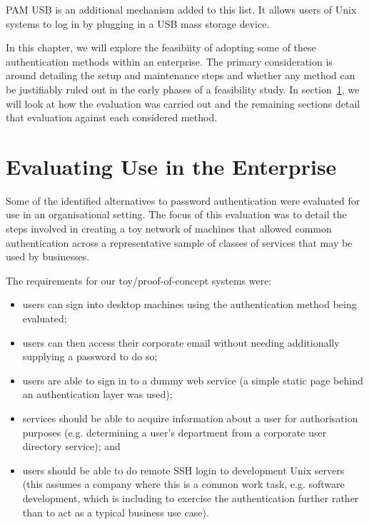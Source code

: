 \documentclass{report}
\begin{document}
PAM USB is an additional mechanism added to
this list. It allows users of Unix systems to log in by plugging in a USB
mass storage device.

In this chapter, we will explore the feasibiity of adopting some of
these authentication methods within an enterprise. The primary consideration
is around detailing the setup and maintenance steps and whether any
method can be justifiably ruled out in the early phases of a feasibility
study. In section~\ref{sec:evaluation}, we will look at how the evaluation
was carried out and the remaining sections detail that evaluation against each
considered method.

\section{Evaluating Use in the Enterprise}
\label{sec:evaluation}

Some of the identified alternatives to password authentication were
evaluated for use in an organisational setting. The focus of this evaluation
was to detail the steps involved in creating a toy network of machines
that allowed common authentication across a representative sample of
classes of services that may be used by businesses.

The requirements for our toy/proof-of-concept systems were:

\begin{itemize}
  \item users can sign into desktop machines using the authentication method
    being evaluated;
  \item users can then access their corporate email without needing additionally
    supplying a password to do so;
  \item users are able to sign in to a dummy web service (a simple static page
    behind an authentication layer was used);
  \item services should be able to acquire information about a user for
    authorisation purposes (e.g. determining a user's department from
    a corporate user directory service); and
  \item users should be able to do remote SSH login to development Unix
    servers (this assumes a company where this is a common work task, e.g.
    software development, which is including to exercise the authentication
    further rather than to act as a typical business use case).
\end{itemize}
\end{document}
